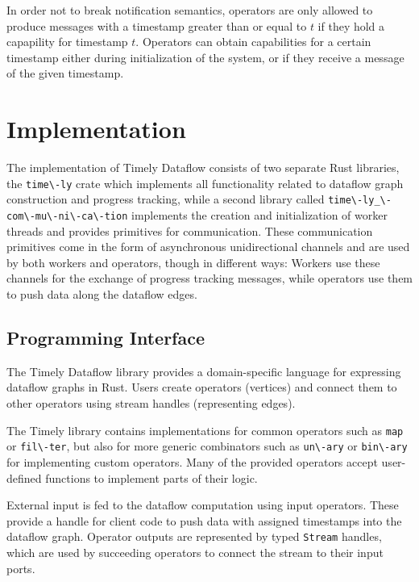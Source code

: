 In order not to break notification semantics, operators are only allowed to
produce messages with a timestamp greater than or equal to $t$ if they hold a
capapility for timestamp $t$. Operators can obtain capabilities for a certain
timestamp either during initialization of the system, or if they receive a
message of the given timestamp.

\section{Implementation}

The implementation of Timely Dataflow consists of two separate Rust libraries,
the \lstinline{time\-ly} crate which implements all functionality related to
dataflow graph construction and progress tracking, while a second library
called \lstinline{time\-ly_\-com\-mu\-ni\-ca\-tion} implements the creation and
initialization of worker threads and provides primitives for communication.
These communication primitives come in the form of asynchronous unidirectional
channels and are used by both workers and operators, though in different ways:
Workers use these channels for the exchange of progress tracking messages, while
operators use them to push data along the dataflow edges.

\subsection{Programming Interface}

The Timely Dataflow library provides a domain-specific language for expressing
dataflow graphs in Rust. Users create operators (vertices) and connect
them to other operators using stream handles (representing edges).

The Timely library contains implementations for common operators such as
\lstinline{map} or \lstinline{fil\-ter}, but also for more generic combinators
such as \lstinline{un\-ary} or \lstinline{bin\-ary} for implementing custom operators.
Many of the provided operators accept user-defined functions to implement
parts of their logic.

External input is fed to the dataflow computation using input operators. These
provide a handle for client code to push data with assigned timestamps into
the dataflow graph. Operator outputs are represented
by typed \lstinline{Stream} handles, which are used by succeeding operators
to connect the stream to their input ports.

